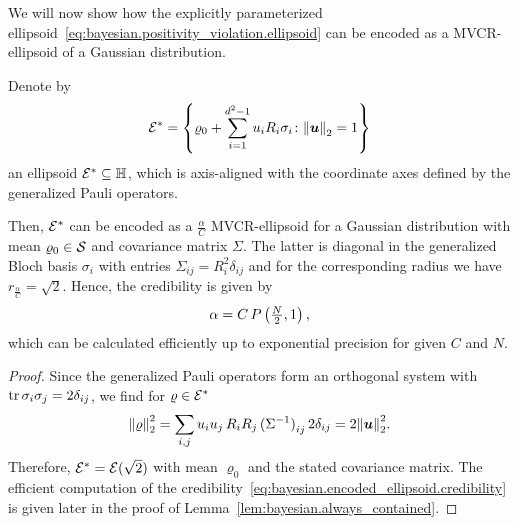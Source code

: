 We will now show how the explicitly parameterized ellipsoid~\eqref{eq:bayesian.positivity_violation.ellipsoid} can be encoded as a MVCR-ellipsoid of a Gaussian distribution.

\begin{lemma}\label{lem:bayesian.encoded_ellipsoid}
  Denote by
  \begin{equation}
   \mathcal{E}^* = \left\{ \varrho_0 + \sum_{i=1}^{d^2 - 1} u_i R_i \sigma_i \colon {\Vert{\boldsymbol{u}}\Vert}_2 = 1 \right\}
  \end{equation}
  an ellipsoid $\mathcal{E}^* \subseteq \mathbb{H}$, which is axis-aligned with the coordinate axes defined by the generalized Pauli operators.

  Then, $\mathcal{E}^*$ can be encoded as a $\frac{\alpha}{C}$ MVCR-ellipsoid for a Gaussian distribution with mean $\varrho_0 \in \mathcal{S}$ and covariance matrix $\Sigma$.
  The latter is diagonal in the generalized Bloch basis $\sigma_i$ with entries $\Sigma_{ij} = R_i^2 \delta_{ij}$ and for the corresponding radius we have $r_\frac{\alpha}{C} = \sqrt{2}$.
  Hence, the credibility is given by
  \begin{equation}
    \label{eq:bayesian.encoded_ellipsoid.credibility}
    \alpha = C\, P\left(\tfrac{N}{2}, 1\right),
  \end{equation}
  which can be calculated efficiently up to exponential precision for given $C$ and $N$.
 \end{lemma}
 \begin{proof}
   Since the generalized Pauli operators form an orthogonal system with $\operatorname{tr} \sigma_i \sigma_j = 2 \delta_{ij}$, we find for $\varrho \in \mathcal{E}^*$
   \begin{equation}
      {\Vert\varrho\Vert}^2_2 = \sum_{i,j} u_i u_j \, R_i R_j \, {(\Sigma^{-1})}_{ij} \, 2 \delta_{ij} = 2 {\Vert{\boldsymbol{u}}\Vert}_2^2.
   \end{equation}
   Therefore, $\mathcal{E}^* = \mathcal{E}(\sqrt{2})$ with mean $\varrho_0$ and the stated covariance matrix.
   The efficient computation of the credibility~\eqref{eq:bayesian.encoded_ellipsoid.credibility} is given later in the proof of Lemma~\ref{lem:bayesian.always_contained}.
 \end{proof}


